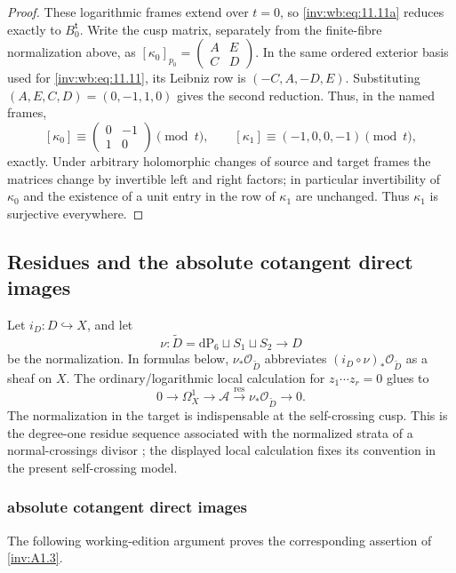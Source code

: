 \begin{proof}
These logarithmic frames extend over \(t=0\), so \eqref{inv:wb:eq:11.11a} reduces exactly
to \(B_0^{\mathsf t}\).  Write the cusp matrix, separately from the
finite-fibre normalization above, as
\([\kappa_0]_{p_0}=\left(\begin{smallmatrix}A&E\\C&D\end{smallmatrix}\right)\).
In the same ordered exterior basis used for \eqref{inv:wb:eq:11.11}, its Leibniz row is
\((-C,A,-D,E)\).  Substituting
\((A,E,C,D)=(0,-1,1,0)\) gives the second reduction.  Thus, in the named
frames,
\[
 [\kappa_0]\equiv\begin{pmatrix}0&-1\\1&0\end{pmatrix}\pmod t,
 \qquad [\kappa_1]\equiv(-1,0,0,-1)\pmod t,
\]
exactly.  Under arbitrary holomorphic changes of source and target frames
the matrices change by invertible left and right factors; in particular
invertibility of \(\kappa_0\) and the existence of a unit entry in the row
of \(\kappa_1\) are unchanged.  Thus $\kappa_1$ is surjective everywhere.
\end{proof}

\subsection{Residues and the absolute cotangent direct images}

Let $i_D:D\hookrightarrow X$, and let
\[
 \nu:\widetilde D=\mathrm{dP}_6\sqcup S_1\sqcup S_2\longrightarrow D
\]
be the normalization.  In formulas below, $\nu_*\mathcal O_{\widetilde D}$
abbreviates $(i_D\circ\nu)_*\mathcal O_{\widetilde D}$ as a sheaf on $X$.
The ordinary/logarithmic local calculation for
$z_1\cdots z_r=0$ glues to
\[
 0\longrightarrow\Omega_X^1\longrightarrow\mathcal A
 \xrightarrow{\operatorname{res}}\nu_*\mathcal O_{\widetilde D}
 \longrightarrow0.
\tag{WBH.11.12}\label{inv:wb:eq:11.12}
\]
The normalization in the target is indispensable at the self-crossing
cusp.  This is the degree-one residue sequence associated with the normalized
strata of a normal-crossings divisor
\cite[Chapter~II, \S3.4--3.7, pp.~76--78]{Deligne1970}; the displayed local
calculation fixes its convention in the present self-crossing model.

\subsubsection{absolute cotangent direct images}\label{inv:wbproof:prop:absolute-cotangent-direct-images}
The following working-edition argument proves the corresponding assertion of \cref{inv:A1.3}.



